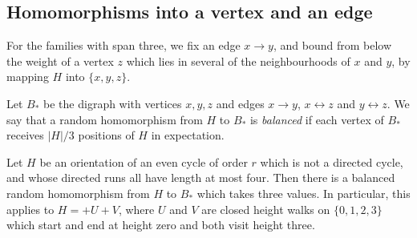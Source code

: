 \subsection{Homomorphisms into a vertex and an edge}
For the families with span three, we fix an edge $x\to y$, and bound from below the weight of a vertex $z$ which lies in several of the neighbourhoods of $x$ and $y$, by mapping $H$ into $\{x,y,z\}$.

Let $B_*$ be the digraph with vertices $x,y,z$ and edges
$x\to y$, $x\leftrightarrow z$ and $y\leftrightarrow z$.
We say that a random homomorphism from $H$ to $B_*$ is \emph{balanced} if each
vertex of $B_*$ receives $|H|/3$ positions of $H$ in expectation.

\begin{lemma}
\label{compact390:balanced-template}
Let $H$ be an orientation of an even cycle of order $r$ which is not a directed cycle, and whose directed runs all have length at most four. Then there is a balanced random homomorphism from $H$ to $B_*$ which takes three values.
In particular, this applies to $H=+U+V$, where $U$ and $V$ are closed
height walks on $\{0,1,2,3\}$ which start and end at height zero and both visit height three.
\end{lemma}
